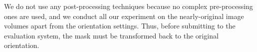 We do not use any post-processing techniques because no complex pre-processing ones are used, and we conduct all our experiment on the nearly-original image volumes apart from the orientation settings. Thus, before submitting to the evaluation system, the mask must be transformed back to the original orientation.